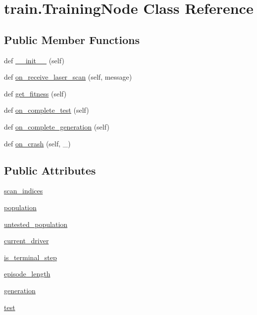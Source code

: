 \hypertarget{classtrain_1_1_training_node}{}\section{train.\+Training\+Node Class Reference}
\label{classtrain_1_1_training_node}
\subsection*{Public Member Functions}
\begin{DoxyCompactItemize}
\item 
def \hyperlink{classtrain_1_1_training_node_ad96f8dcaf361b62d52b808eb0dd7e800}{\+\_\+\+\_\+init\+\_\+\+\_\+} (self)
\item 
def \hyperlink{classtrain_1_1_training_node_a067b96ed2965a0c7daf88827858d4a66}{on\+\_\+receive\+\_\+laser\+\_\+scan} (self, message)
\item 
def \hyperlink{classtrain_1_1_training_node_a3779924e099cc6fe56ba071a9c21ef88}{get\+\_\+fitness} (self)
\item 
def \hyperlink{classtrain_1_1_training_node_af54dce4a778ce1074d412abd1b541c28}{on\+\_\+complete\+\_\+test} (self)
\item 
def \hyperlink{classtrain_1_1_training_node_af31435707c74d9b609075e225b65e8cb}{on\+\_\+complete\+\_\+generation} (self)
\item 
def \hyperlink{classtrain_1_1_training_node_a527f3ba275a347fc27afe25b4cf14d5a}{on\+\_\+crash} (self, \+\_\+)
\end{DoxyCompactItemize}
\subsection*{Public Attributes}
\begin{DoxyCompactItemize}
\item 
\hyperlink{classtrain_1_1_training_node_adc0b51385828f502a6394aadc342eb56}{scan\+\_\+indices}
\item 
\hyperlink{classtrain_1_1_training_node_a73a06dfa3230d4f26cc9767488b30385}{population}
\item 
\hyperlink{classtrain_1_1_training_node_a6724c3a14d24c6d8d6a4d7e29126627f}{untested\+\_\+population}
\item 
\hyperlink{classtrain_1_1_training_node_a81d0481151f7b23e6489027fa1a87e47}{current\+\_\+driver}
\item 
\hyperlink{classtrain_1_1_training_node_aa17107636d9a2df25960aa1076d9b987}{is\+\_\+terminal\+\_\+step}
\item 
\hyperlink{classtrain_1_1_training_node_a58926a0e5681d22983ca345ebb7771bd}{episode\+\_\+length}
\item 
\hyperlink{classtrain_1_1_training_node_a3ba5470e3146e9bb1303ed906b868d28}{generation}
\item 
\hyperlink{classtrain_1_1_training_node_a26350a860e1c0aaf7653da42c55fa93a}{test}
\end{DoxyCompactItemize}


